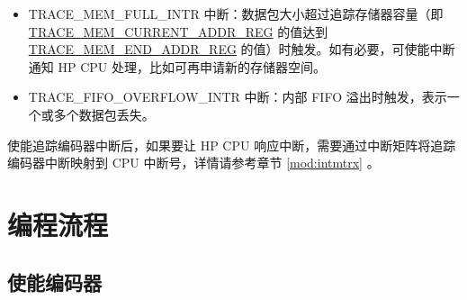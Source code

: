 \documentclass[main\_\_CN.tex]{subfiles}
\begin{document}
\begin{itemize}
    \item TRACE\_MEM\_FULL\_INTR 中断：数据包大小超过追踪存储器容量（即 \hyperref[regdesc:TRACEMEMCURRENTADDRREG]{TRACE\_MEM\_CURRENT\_ADDR\_REG} 的值达到 \hyperref[regdesc:TRACEMEMENDADDRREG]{TRACE\_MEM\_END\_ADDR\_REG} 的值）时触发。如有必要，可使能中断通知 HP CPU 处理，比如可再申请新的存储器空间。
    \item TRACE\_FIFO\_OVERFLOW\_INTR 中断：内部 FIFO 溢出时触发，表示一个或多个数据包丢失。
\end{itemize}

使能追踪编码器中断后，如果要让 HP CPU 响应中断，需要通过中断矩阵将追踪编码器中断映射到 CPU 中断号，详情请参考章节 \ref{mod:intmtrx} \textit{}。


\section{编程流程}
\label{sec:riscvtracenc-prog-procedures}

\subsection{使能编码器}
\end{document}
